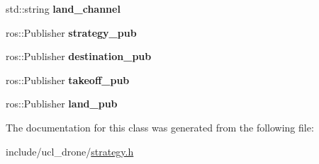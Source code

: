 \begin{DoxyCompactItemize}
std\+::string {\bfseries land\+\_\+channel}
\item 
\mbox{\label{classStrategy_a9f6cb812568383dc5f6ead712a834775}} 
ros\+::\+Publisher {\bfseries strategy\+\_\+pub}
\item 
\mbox{\label{classStrategy_a04eb8ad81f1c04d28b6f8cdac79bb5da}} 
ros\+::\+Publisher {\bfseries destination\+\_\+pub}
\item 
\mbox{\label{classStrategy_addc57fbde81ebfce1e6cce5a2442c9a7}} 
ros\+::\+Publisher {\bfseries takeoff\+\_\+pub}
\item 
\mbox{\label{classStrategy_ae0105e8c02b4301b55d8daa879a75604}} 
ros\+::\+Publisher {\bfseries land\+\_\+pub}
\end{DoxyCompactItemize}


The documentation for this class was generated from the following file\+:\begin{DoxyCompactItemize}
\item 
include/ucl\+\_\+drone/\hyperlink{strategy_8h}{strategy.\+h}\end{DoxyCompactItemize}
